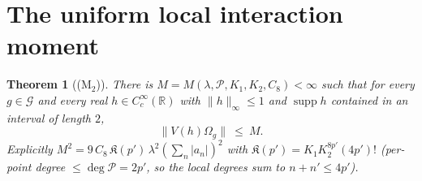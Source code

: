 \documentclass[11pt,a4paper]{article}
\theoremstyle{plain}
\newtheorem{theorem}{Theorem}[section]
\theoremstyle{definition}
\newcommand{\R}{\mathbb{R}}
\newcommand{\G}{\mathcal{G}}
\newcommand{\Om}{\Omega}
\DeclareMathOperator{\supp}{supp}
\begin{document}
\section{The uniform local interaction moment}\label{sec:M2}

\begin{theorem}[(M$_2$)]\label{thm:M2-main}
There is $M=M(\lambda,\mathscr P,K_1,K_2,C_8)<\infty$ such that for every $g\in\G$ and every
real $h\in C_c^\infty(\R)$ with $\|h\|_\infty\le1$ and $\supp h$ contained in an interval of
length $2$,
\[
  \|V(h)\Om_g\|\ \le\ M .
\]
Explicitly $M^2=9\,C_8\,\mathfrak K(p')\,\lambda^2(\sum_n|a_n|)^2$ with
$\mathfrak K(p')=K_1K_2^{8p'}(4p')!$ (per-point degree $\le\deg\mathscr P=2p'$, so the local degrees sum to $n+n'\le4p'$).
\end{theorem}
\end{document}
